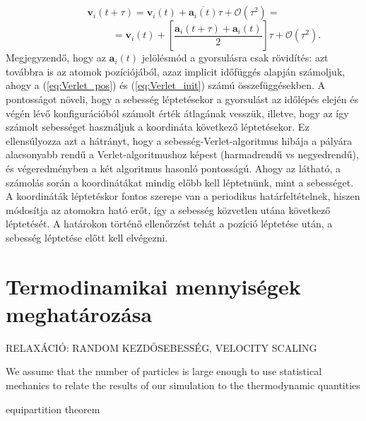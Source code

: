 \documentclass[12pt]{article}
\theoremstyle{plain}
\begin{document}
\begin{equation}
	\mathbf{v}_i (t+\tau) = \mathbf{v}_i(t) + \overline{\mathbf{a}_i(t)} \tau + \mathcal{O}(\tau^2) =
	\label{eq:velVerlet_vel}
\end{equation}
\begin{equation*}
	~~~~~~~~~~~~~~~~~~~~~~~~~~~~~~ =\mathbf{v}_i(t) + \left[\frac{ \mathbf{a}_i(t+\tau) + \mathbf{a}_i(t)}{2}\right] \tau + \mathcal{O}(\tau^2).
\end{equation*}
Megjegyzendő, hogy az $\mathbf{a}_i(t)$ jelölésmód a gyorsulásra csak rövidítés: azt továbbra is az atomok pozíciójából, azaz implicit időfüggés alapján számoljuk, ahogy a (\ref{eq:Verlet_pos}) és (\ref{eq:Verlet_init}) számú összefüggésekben. A pontosságot növeli, hogy a sebesség léptetésekor a gyorsulást az időlépés elején és végén lévő konfigurációból számolt érték átlagának vesszük, illetve, hogy az így számolt sebességet használjuk a koordináta következő léptetésekor. Ez ellensúlyozza azt a hátrányt, hogy a sebesség-Verlet-algoritmus hibája a pályára alacsonyabb rendű a Verlet-algoritmushoz képest (harmadrendű vs negyedrendű), és végeredményben a két algoritmus hasonló pontosságú. Ahogy az látható, a számolás során a koordinátákat mindig előbb kell léptetnünk, mint a sebességet. A koordináták léptetéskor fontos szerepe van a periodikus határfeltételnek, hiszen módosítja az atomokra ható erőt, így a sebesség közvetlen utána következő léptetését. A határokon történő ellenőrzést tehát a pozíció léptetése után, a sebesség léptetése előtt kell elvégezni.



\section{Termodinamikai mennyiségek meghatározása}

RELAXÁCIÓ: RANDOM KEZDŐSEBESSÉG, VELOCITY SCALING

We assume that the number of particles is large enough to use statistical mechanics to relate
the results of our simulation to the thermodynamic quantities

equipartition theorem









\end{document}
